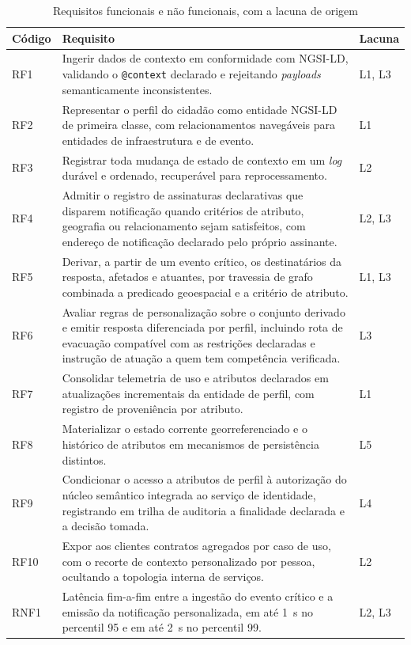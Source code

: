 \begin{table}[H]
\centering
\caption{Requisitos funcionais e não funcionais, com a lacuna de origem}
\label{tab:requisitos}
\scriptsize
\begin{tabularx}{\textwidth}{@{}l X l@{}}
\toprule
\textbf{Código} & \textbf{Requisito} & \textbf{Lacuna} \\
\midrule
RF1 & Ingerir dados de contexto em conformidade com NGSI-LD, validando o \texttt{@context} declarado e rejeitando \textit{payloads} semanticamente inconsistentes. & L1, L3 \\
RF2 & Representar o perfil do cidadão como entidade NGSI-LD de primeira classe, com relacionamentos navegáveis para entidades de infraestrutura e de evento. & L1 \\
RF3 & Registrar toda mudança de estado de contexto em um \textit{log} durável e ordenado, recuperável para reprocessamento. & L2 \\
RF4 & Admitir o registro de assinaturas declarativas que disparem notificação quando critérios de atributo, geografia ou relacionamento sejam satisfeitos, com endereço de notificação declarado pelo próprio assinante. & L2, L3 \\
RF5 & Derivar, a partir de um evento crítico, os destinatários da resposta, afetados e atuantes, por travessia de grafo combinada a predicado geoespacial e a critério de atributo. & L1, L3 \\
RF6 & Avaliar regras de personalização sobre o conjunto derivado e emitir resposta diferenciada por perfil, incluindo rota de evacuação compatível com as restrições declaradas e instrução de atuação a quem tem competência verificada. & L3 \\
RF7 & Consolidar telemetria de uso e atributos declarados em atualizações incrementais da entidade de perfil, com registro de proveniência por atributo. & L1 \\
RF8 & Materializar o estado corrente georreferenciado e o histórico de atributos em mecanismos de persistência distintos. & L5 \\
RF9 & Condicionar o acesso a atributos de perfil à autorização do núcleo semântico integrada ao serviço de identidade, registrando em trilha de auditoria a finalidade declarada e a decisão tomada. & L4 \\
RF10 & Expor aos clientes contratos agregados por caso de uso, com o recorte de contexto personalizado por pessoa, ocultando a topologia interna de serviços. & L2 \\
\midrule
RNF1 & Latência fim-a-fim entre a ingestão do evento crítico e a emissão da notificação personalizada, em até 1~s no percentil 95 e em até 2~s no percentil 99. & L2, L3 \\

\end{tabularx}
\end{table}
